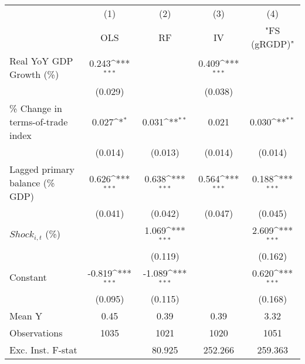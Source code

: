 {
\def\sym#1{\ifmmode^{#1}\else\(^{#1}\)\fi}
\begin{tabular}{l*{4}{c}}
\toprule
                    &\multicolumn{1}{c}{(1)}&\multicolumn{1}{c}{(2)}&\multicolumn{1}{c}{(3)}&\multicolumn{1}{c}{(4)}\\
                    &\multicolumn{1}{c}{OLS}&\multicolumn{1}{c}{RF}&\multicolumn{1}{c}{IV}&\multicolumn{1}{c}{ "FS (gRGDP)" }\\
\midrule
Real YoY GDP Growth (\%)&       0.243\sym{***}&                     &       0.409\sym{***}&                     \\
                    &     (0.029)         &                     &     (0.038)         &                     \\
\addlinespace
\% Change in terms-of-trade index&       0.027\sym{*}  &       0.031\sym{**} &       0.021         &       0.030\sym{**} \\
                    &     (0.014)         &     (0.013)         &     (0.014)         &     (0.014)         \\
\addlinespace
Lagged primary balance (\% GDP)&       0.626\sym{***}&       0.638\sym{***}&       0.564\sym{***}&       0.188\sym{***}\\
                    &     (0.041)         &     (0.042)         &     (0.047)         &     (0.045)         \\
\addlinespace
$ Shock_{i,t}$ (\%) &                     &       1.069\sym{***}&                     &       2.609\sym{***}\\
                    &                     &     (0.119)         &                     &     (0.162)         \\
\addlinespace
Constant            &      -0.819\sym{***}&      -1.089\sym{***}&                     &       0.620\sym{***}\\
                    &     (0.095)         &     (0.115)         &                     &     (0.168)         \\
\midrule
Mean Y              &        0.45         &        0.39         &        0.39         &        3.32         \\
Observations        &        1035         &        1021         &        1020         &        1051         \\
Exc. Inst. F-stat   &                     &      80.925         &     252.266         &     259.363         \\
\bottomrule
\end{tabular}
}
